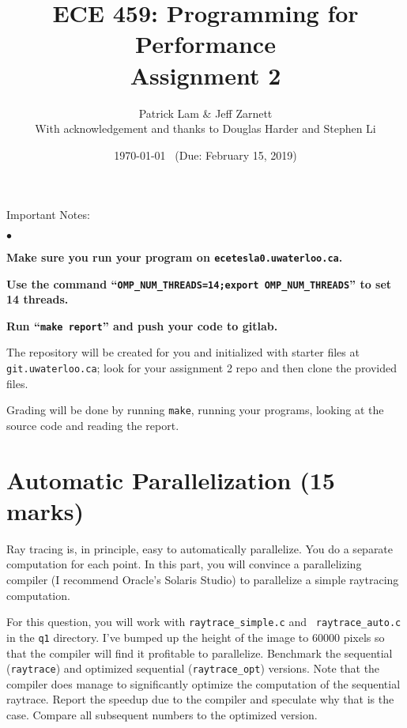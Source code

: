 \documentclass[letterpaper,10pt]{article}
\title{\bf ECE 459: Programming for Performance\\Assignment 2}
\author{Patrick Lam \& Jeff Zarnett\\
\small{With acknowledgement and thanks to Douglas Harder and Stephen Li}}
\date{\today ~ (Due: February 15, 2019)}
\begin{document}
\maketitle
\newcommand{\squishlist}{
 \begin{list}{$\bullet$}
  { \setlength{\itemsep}{0pt}
     \setlength{\parsep}{3pt}
     \setlength{\topsep}{3pt}
     \setlength{\partopsep}{0pt}
     \setlength{\leftmargin}{1.5em}
     \setlength{\labelwidth}{1em}
     \setlength{\labelsep}{0.5em} } }
\newcommand{\squishend}{
  \end{list}  }

\noindent
Important Notes:

\squishlist
  \item {\bf Make sure you run your program on {\tt ecetesla0.uwaterloo.ca}.}
  \item {\bf Use the command ``{\tt OMP\_NUM\_THREADS=14;export OMP\_NUM\_THREADS}'' to set 14 threads.}
  \item {\bf Run ``{\tt make report}'' and push your code to gitlab.}
\squishend

\noindent
The repository will be created for you and initialized with starter files 
at \texttt{git.uwaterloo.ca}; look for your 
assignment 2 repo and then clone the provided files.

Grading will be done by running {\tt make}, running your programs,
looking at the source code and reading the report.

\section{Automatic Parallelization (15 marks)}
Ray tracing is, in principle, easy to automatically parallelize. You do
a separate computation for each point. In this part, you will convince a
parallelizing compiler (I recommend Oracle's Solaris Studio) to parallelize
a simple raytracing computation.

For this question, you will work with {\tt raytrace\_simple.c} and {\tt
  raytrace\_auto.c} in the {\tt q1} directory.  I've bumped up the
height of the image to 60000 pixels so that the compiler will find it
profitable to parallelize. Benchmark the sequential ({\tt raytrace})
and optimized sequential ({\tt raytrace\_opt}) versions. Note that the
compiler does manage to significantly optimize the computation of the sequential
raytrace. Report the speedup due to the compiler and
speculate why that is the case. Compare all subsequent numbers
to the optimized version.
\end{document}

